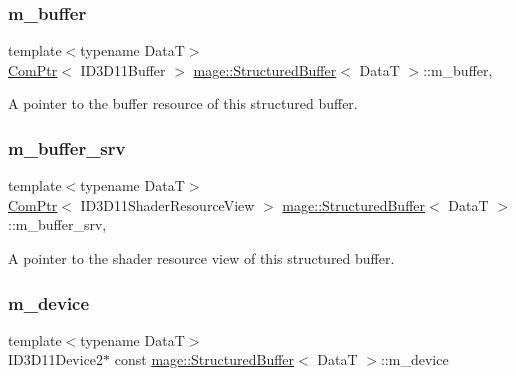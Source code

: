 \subsubsection{\texorpdfstring{m\+\_\+buffer}{m\_buffer}}
{\footnotesize\ttfamily template$<$typename DataT$>$ \\
\hyperlink{namespacemage_ae74f374780900893caa5555d1031fd79}{Com\+Ptr}$<$ I\+D3\+D11\+Buffer $>$ \hyperlink{structmage_1_1_structured_buffer}{mage\+::\+Structured\+Buffer}$<$ DataT $>$\+::m\+\_\+buffer\hspace{0.3cm}{\ttfamily [mutable]}, {\ttfamily [private]}}

A pointer to the buffer resource of this structured buffer. \hypertarget{structmage_1_1_structured_buffer_a94f811f1d36cf63dad600e6f89dcc40b}{}\label{structmage_1_1_structured_buffer_a94f811f1d36cf63dad600e6f89dcc40b} 
\subsubsection{\texorpdfstring{m\+\_\+buffer\+\_\+srv}{m\_buffer\_srv}}
{\footnotesize\ttfamily template$<$typename DataT$>$ \\
\hyperlink{namespacemage_ae74f374780900893caa5555d1031fd79}{Com\+Ptr}$<$ I\+D3\+D11\+Shader\+Resource\+View $>$ \hyperlink{structmage_1_1_structured_buffer}{mage\+::\+Structured\+Buffer}$<$ DataT $>$\+::m\+\_\+buffer\+\_\+srv\hspace{0.3cm}{\ttfamily [mutable]}, {\ttfamily [private]}}

A pointer to the shader resource view of this structured buffer. \hypertarget{structmage_1_1_structured_buffer_ab1ad27b8053f9631f0a74b9e90aa7d3d}{}\label{structmage_1_1_structured_buffer_ab1ad27b8053f9631f0a74b9e90aa7d3d} 
\subsubsection{\texorpdfstring{m\+\_\+device}{m\_device}}
{\footnotesize\ttfamily template$<$typename DataT$>$ \\
I\+D3\+D11\+Device2$\ast$ const \hyperlink{structmage_1_1_structured_buffer}{mage\+::\+Structured\+Buffer}$<$ DataT $>$\+::m\+\_\+device\hspace{0.3cm}{\ttfamily [private]}}

